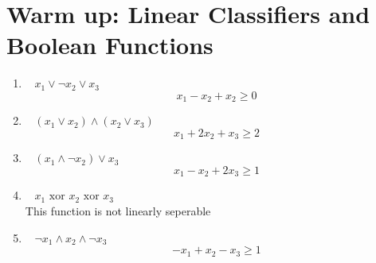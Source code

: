 \section{Warm up: Linear Classifiers and Boolean Functions}\label{sec:q1}

\begin{enumerate}
\item~ $x_1\vee\neg x_2\vee x_3$\\
$$ x_1 - x_2 + x_2 \geq 0 $$

\item~ $(x_1\vee x_2)\wedge (x_2\vee x_3)$\\
$$ x_1 + 2x_2 + x_3 \geq 2 $$

\item~ $(x_1\wedge\neg x_2)\vee x_3$\\
$$x_1 - x_2 + 2x_3 \geq 1$$

\item~ $x_1\text{ xor } x_2\text{ xor }x_3$\\
This function is not linearly seperable

\item~ $\neg x_1 \wedge x_2\wedge\neg x_3$\\
$$ -x_1 + x_2 - x_3 \geq 1 $$

\end{enumerate}
